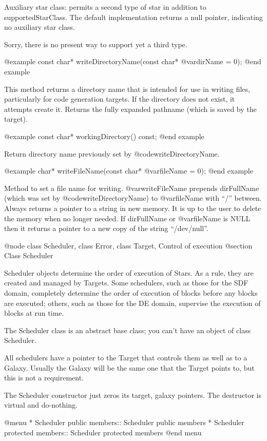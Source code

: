 Auxiliary star class: permits a second type of star in addition
to supportedStarClass.  The default implementation returns a
null pointer, indicating no auxiliary star class.

Sorry, there is no present way to support yet a third type.

@example
const char* writeDirectoryName(const char* @var{dirName} = 0);
@end example

This method returns a directory name that is intended for
use in writing files, particularly for code generation targets.
If the directory does not exist, it attempts create it.
Returns the fully expanded pathname (which is saved by
the target).

@example
const char* workingDirectory() const;
@end example

Return directory name previously set by @code{writeDirectoryName}.

@example
char* writeFileName(const char* @var{fileName} = 0);
@end example

Method to set a file name for writing.  @var{writeFileName} prepends
dirFullName (which was set by @code{writeDirectoryName}) to
@var{fileName} with ``/'' between.  Always returns a pointer to a string
in new memory.  It is up to the user to delete the memory when no longer
needed.  If dirFullName or @var{fileName} is NULL then it returns a pointer to
a new copy of the string ``/dev/null''.

@node class Scheduler, class Error, class Target, Control of execution
@section Class Scheduler

Scheduler objects determine the order of execution of Stars.  As a rule,
they are created and managed by Targets.  Some schedulers, such as those
for the SDF domain, completely determine the order of execution of
blocks before any blocks are executed; others, such as those for the
DE domain, supervise the execution of blocks at run time.

The Scheduler class is an abstract base class; you can't have an object
of class Scheduler.

All schedulers have a pointer to the Target that controls them as well
as to a Galaxy.  Usually the Galaxy will be the same one that the
Target points to, but this is not a requirement.

The Scheduler constructor just zeros its target, galaxy pointers.  The
destructor is virtual and do-nothing.

@menu
* Scheduler public members::    Scheduler public members
* Scheduler protected members::  Scheduler protected members
@end menu

